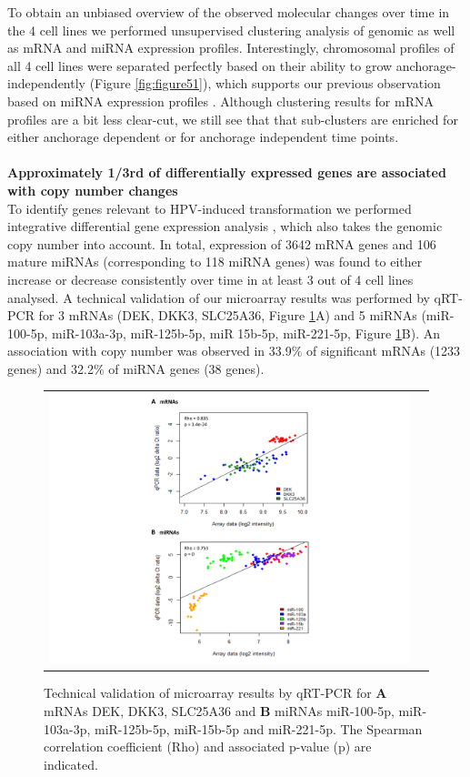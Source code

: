 To obtain an unbiased overview of the observed molecular changes over time in the 4 cell lines we performed unsupervised clustering analysis of genomic as well as mRNA and miRNA expression profiles. Interestingly, chromosomal profiles of all 4 cell lines were separated perfectly based on their ability to grow anchorage-independently (Figure \ref{fig:figure51}), which supports our previous observation based on miRNA expression profiles \cite{Wilting2016}. Although clustering results for mRNA profiles are a bit less clear-cut, we still see that that sub-clusters are enriched for either anchorage dependent or for anchorage independent time points. 
\\
\\
\textbf{Approximately 1/3rd of differentially expressed genes are associated with copy number changes}
\\
To identify genes relevant to HPV-induced transformation we performed integrative differential gene expression analysis \cite{Miok2014}, which also takes the genomic copy number into account. In total, expression of 3642 mRNA genes and 106 mature miRNAs (corresponding to 118 miRNA genes) was found to either increase or decrease consistently over time in at least 3 out of 4 cell lines analysed. A technical validation of our microarray results was performed by qRT-PCR for 3 mRNAs (DEK, DKK3, SLC25A36, Figure \ref{fig:figure52}A) and 5 miRNAs (miR-100-5p, miR-103a-3p, miR-125b-5p, miR 15b-5p, miR-221-5p, Figure \ref{fig:figure52}B). An association with copy number was observed in 33.9$\%$ of significant mRNAs (1233 genes) and 32.2$\%$ of miRNA genes (38 genes).
\begin{figure}[h!]
\centering
\begin{tabular}{cc} 
\includegraphics[scale=0.65]{Figure2.pdf}
\end{tabular}
\caption{Technical validation of microarray results by qRT-PCR for \textbf{A} mRNAs DEK, DKK3, SLC25A36 and \textbf{B} miRNAs miR-100-5p, miR-103a-3p, miR-125b-5p, miR-15b-5p and miR-221-5p. The Spearman correlation coefficient (Rho) and associated p-value (p) are indicated.}
\label{fig:figure52}
\end{figure}
